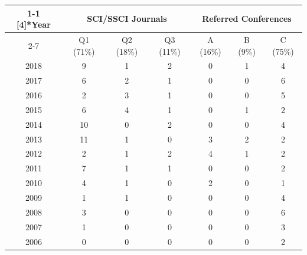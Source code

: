 \documentclass{tikzposter} %
\begin{document}
\begin{columns}
{\begin{multicols}{2}
{\begin{minipage}{\linewidth}
{		
		}		
	\end{minipage}
	}
	\vfill
	\scalebox{0.6}
	{
		\begin{minipage}{\linewidth}
	  	\begin{tabular}{c|c c c|c c c}
	    		\toprule
			\cmidrule{1-1}    \multirow{2}[4]{*}{Year} & \multicolumn{3}{c}{SCI/SSCI Journals} &\multicolumn{3}{c}{Referred Conferences} \\
			\cmidrule{2-7}          & Q1 (71\%) & Q2 (18\%) & Q3 (11\%) & A (16\%) & B (9\%) & C (75\%) \\
	 		\midrule
	    2018  & 9     & 1     & 2     & 0     & 1     & 4 \\
	    2017  & 6     & 2     & 1     & 0     & 0     & 6 \\
	    2016  & 2     & 3     & 1     & 0     & 0     & 5 \\
	    2015  & 6     & 4     & 1     & 0     & 1     & 2 \\
	    2014  & 10    & 0     & 2     & 0     & 0     & 4 \\
	    2013  & 11    & 1     & 0     & 3     & 2     & 2 \\
	    2012  & 2     & 1     & 2     & 4     & 1     & 2 \\
	    2011  & 7     & 1     & 1     & 0     & 0     & 2 \\
	    2010  & 4     & 1     & 0     & 2     & 0     & 1 \\
	    2009  & 1     & 1     & 0     & 0     & 0     & 4 \\
	    2008  & 3     & 0     & 0     & 0     & 0     & 6 \\
	    2007  & 1     & 0     & 0     & 0     & 0     & 3 \\
	    2006  & 0     & 0     & 0     & 0     & 0     & 2 \\
	    		\bottomrule
	    	\end{tabular}
	\end{minipage}
	}	
	
\end{multicols}

}
\end{columns}
\end{document}
